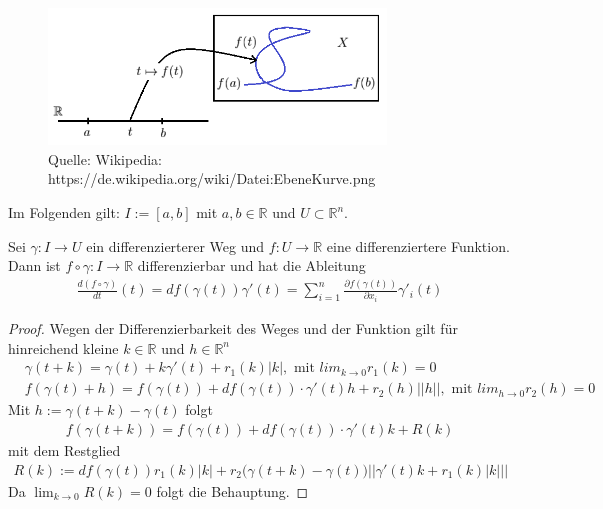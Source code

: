 \begin{figure}[H]
      \centering
    \includegraphics[width=0.8\textwidth]{images/EbeneKurve}
      \caption{Quelle: Wikipedia: https://de.wikipedia.org/wiki/Datei:EbeneKurve.png}
\end{figure}
Im Folgenden gilt: $I := [a, b]$ mit $a,b \in \mathbb{R}$ und $U \subset \mathbb{R}^n$.
\begin{Satz}
Sei $\gamma: I \to U$ ein differenzierterer Weg und $f: U \to \mathbb{R}$ eine differenziertere Funktion. Dann ist $f \circ \gamma : I \to \mathbb{R}$ differenzierbar und hat die Ableitung
\begin{align*}
\frac{d(f \circ \gamma)}{dt}(t) = df(\gamma(t))\gamma'(t) = \sum_{i=1}^n  \frac{\partial f (\gamma(t))}{\partial x_i} \gamma'_i(t)
\end{align*} 
\end{Satz}


\begin{proof}
Wegen der Differenzierbarkeit des Weges und der Funktion gilt für hinreichend kleine $k \in \mathbb{R}$ und $h \in \mathbb{R}^n$
\begin{align*}
& \gamma (t + k) = \gamma(t) + k \gamma'(t) + r_1 (k) |k|, \text{ mit } lim_{k \to 0} r_1(k) = 0  \\
& f(\gamma(t) + h) = f(\gamma(t)) + df(\gamma(t)) \cdot \gamma'(t) h +  r_2 (h)  ||h|| , \text{ mit } lim_{h \to 0} r_2(h) = 0 
\end{align*} 
 Mit $h:= \gamma(t + k) - \gamma(t)$ folgt
\begin{align*}
f(\gamma(t + k)) = f(\gamma(t)) + df(\gamma(t)) \cdot \gamma'(t) k +  R(k)
\end{align*}  
mit dem Restglied
\begin{align*}
R(k) := df(\gamma(t)) r_1(k) |k| + r_2 \bigl( \gamma (t + k) - \gamma(t) \bigr) ||\gamma'(t) k + r_1(k) |k| || 
\end{align*}  
Da $\lim_{k \to 0} R(k) = 0$ folgt die Behauptung.
\end{proof}




